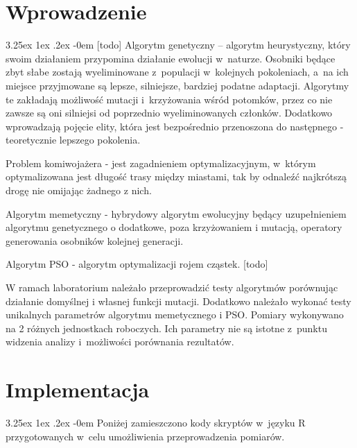 \documentclass[11pt, a4paper]{article}
\date{\today}
\makeatletter
\newcommand{\fbi}{\leavevmode{\parindent=1em\indent}}
\renewcommand\paragraph{\@startsection{paragraph}{5}{\z@}
  {3.25ex \@plus1ex \@minus.2ex}
  {-0em}
  {\normalfont\normalsize\bfseries}}
\makeatother
\begin{document}


\tableofcontents

\newpage
\section{Wprowadzenie}
\paragraph{}
[todo]
\fbi
Algorytm genetyczny – algorytm heurystyczny, który swoim działaniem przypomina działanie ewolucji w~naturze. Osobniki będące zbyt słabe zostają wyeliminowane z~populacji w~kolejnych pokoleniach, a~na ich miejsce przyjmowane są lepsze, silniejsze, bardziej podatne adaptacji. Algorytmy te zakładają możliwość mutacji i~krzyżowania wśród potomków, przez co nie zawsze są oni silniejsi od poprzednio wyeliminowanych członków. Dodatkowo wprowadzają pojęcie elity, która jest bezpośrednio przenoszona do następnego - teoretycznie lepszego pokolenia.

\fbi
Problem komiwojażera - jest zagadnieniem optymalizacyjnym, w~którym optymalizowana jest długość trasy między miastami, tak by odnaleźć najkrótszą drogę nie omijając żadnego z nich.

\fbi
Algorytm memetyczny - hybrydowy algorytm ewolucyjny będący uzupełnieniem algorytmu genetycznego o dodatkowe, poza krzyżowaniem i mutacją, operatory generowania osobników kolejnej generacji.

\fbi
Algorytm PSO - algorytm optymalizacji rojem cząstek. [todo]

\fbi
W ramach laboratorium należało przeprowadzić testy algorytmów porównując działanie domyślnej i własnej funkcji mutacji. Dodatkowo należało wykonać testy unikalnych parametrów algorytmu memetycznego i PSO.
\fbi
Pomiary wykonywano na 2 różnych jednostkach roboczych. Ich parametry nie są istotne z~punktu widzenia analizy i~możliwości porównania rezultatów.

\section{Implementacja}
\paragraph{}
Poniżej zamieszczono kody skryptów w~języku R przygotowanych w~celu umożliwienia przeprowadzenia pomiarów.


\end{document}
